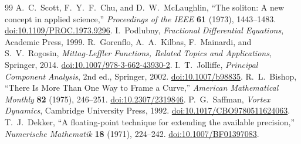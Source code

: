 \documentclass[11pt,a4paper]{article}
\begin{document}
\begin{thebibliography}{99}
 A.~C.~Scott, F.~Y.~F.~Chu, and D.~W.~McLaughlin, ``The soliton: A new concept in applied science,'' \emph{Proceedings of the IEEE} \textbf{61} (1973), 1443--1483. \href{https://doi.org/10.1109/PROC.1973.9296}{doi:10.1109/PROC.1973.9296}.
 I.~Podlubny, \emph{Fractional Differential Equations}, Academic Press, 1999.
 R.~Gorenflo, A.~A.~Kilbas, F.~Mainardi, and S.~V.~Rogosin, \emph{Mittag-Leffler Functions, Related Topics and Applications}, Springer, 2014. \href{https://doi.org/10.1007/978-3-662-43930-2}{doi:10.1007/978-3-662-43930-2}.
 I.~T.~Jolliffe, \emph{Principal Component Analysis}, 2nd ed., Springer, 2002. \href{https://doi.org/10.1007/b98835}{doi:10.1007/b98835}.
 R.~L.~Bishop, ``There Is More Than One Way to Frame a Curve,'' \emph{American Mathematical Monthly} \textbf{82} (1975), 246--251. \href{https://doi.org/10.2307/2319846}{doi:10.2307/2319846}.
 P.~G.~Saffman, \emph{Vortex Dynamics}, Cambridge University Press, 1992. \href{https://doi.org/10.1017/CBO9780511624063}{doi:10.1017/CBO9780511624063}.
 T.~J.~Dekker, ``A floating-point technique for extending the available precision,'' \emph{Numerische Mathematik} \textbf{18} (1971), 224--242. \href{https://doi.org/10.1007/BF01397083}{doi:10.1007/BF01397083}.
\end{thebibliography}
\end{document}

